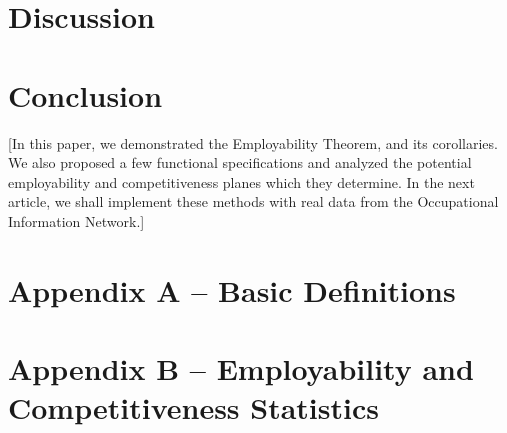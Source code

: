 \documentclass[hidelinks, nonatbib]{elsarticle}
\begin{document}

\section{Discussion}


\section{Conclusion}
[In this paper, we demonstrated the Employability Theorem, and its corollaries. We also proposed a few functional specifications and analyzed the potential employability and competitiveness planes which they determine. In the next article, we shall implement these methods with real data from the Occupational Information Network.]


\newpage
\printbibliography[
    heading=bibintoc,
    title={References}
]


\newpage
\section*{Appendix A -- Basic Definitions}

\section*{Appendix B -- Employability and Competitiveness Statistics}

\end{document}
